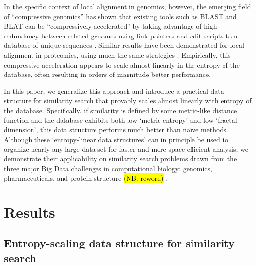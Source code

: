 \documentclass{amsbook}
\theoremstyle{definition}
\theoremstyle{remark}
\numberwithin{equation}{section}
\begin{document}
In the specific context of local alignment in genomics, however, the emerging field of ``compressive genomics'' has shown that existing tools such as BLAST and BLAT can be ``compressively accelerated'' by taking advantage of high redundancy between related genomes using link pointers and edit scripts to a database of unique sequences \cite{loh2012compressive}.
Similar results have been demonstrated for local alignment in proteomics, using much the same strategies \cite{daniels2013compressive}.
Empirically, this compressive acceleration appears to scale almost linearly in the entropy of the database, often resulting in orders of magnitude better performance.

In this paper, we generalize this approach and introduce a practical data structure for similarity search that provably scales almost linearly with entropy of the database.
Specifically, if similarity is defined by some metric-like distance function and the database exhibits both low `metric entropy' and low `fractal dimension', this data structure performs much better than na\"ive methods.
Although these `entropy-linear data structures' can in principle be used to organize nearly any large data set for faster and more space-efficient analysis,
we demonstrate their applicability on similarity search problems drawn from the three major Big Data challenges in computational biology: genomics, pharmaceuticals, and protein structure \hl{(NB: reword)} \cite{marx2013biology}.

\chapter{Results}
\section{Entropy-scaling data structure for similarity search}
\end{document}
